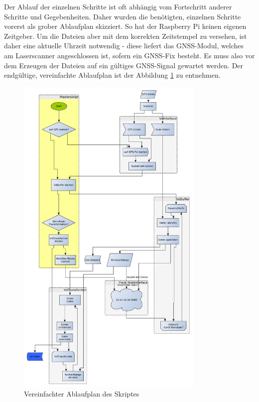 \documentclass[a4paper,12pt,bibliography=totoc, listof=totoc,titlepage]{scrreprt}
\begin{document}
Der Ablauf der einzelnen Schritte ist oft abhängig vom Fortschritt anderer Schritte und Gegebenheiten. Daher wurden die benötigten, einzelnen Schritte vorerst als grober Ablaufplan skizziert. So hat der Raspberry Pi keinen eigenen Zeitgeber. Um die Dateien aber mit dem korrekten Zeitstempel zu versehen, ist daher eine aktuelle Uhrzeit notwendig - diese liefert das GNSS-Modul, welches am Laserscanner angeschlossen ist, sofern ein GNSS-Fix besteht. Es muss also vor dem Erzeugen der Dateien auf ein gültiges GNSS-Signal gewartet werden. Der endgültige, vereinfachte Ablaufplan ist der Abbildung \ref{img:ablaufplan} zu entnehmen. 
\begin{figure}[ht!]
 \centering
 \includegraphics[width=0.8\textwidth]{./img/Ablaufplan.png}
 \caption{Vereinfachter Ablaufplan des Skriptes}
 \label{img:ablaufplan}
\end{figure}
\end{document}
